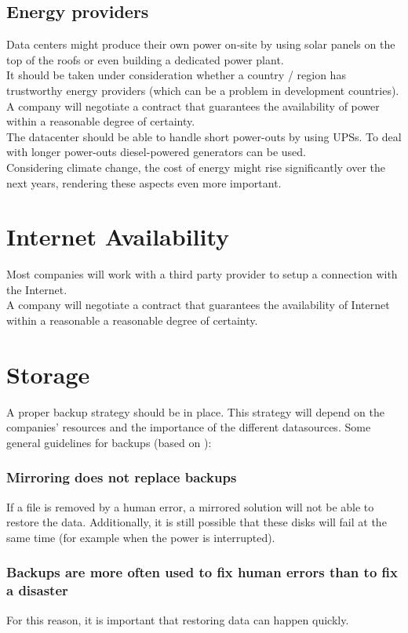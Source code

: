 \documentclass[12pt]{report}
\begin{document}
\subsection{Energy providers}
\label{energy_provider}
Data centers might produce their own power on-site by
using solar panels on the top of the roofs or even building a dedicated
power plant.\\
It should be taken under consideration whether a country / region has
 trustworthy energy providers (which can be a problem in development 
countries).\\
A company will negotiate a contract that guarantees the availability of power
within a reasonable degree of certainty.\\
The datacenter should be able to handle short power-outs by using
UPSs. To deal with longer power-outs diesel-powered generators can be used.\\
Considering climate change, the cost of energy might rise
significantly over the next years, rendering these aspects even more important.

\section{Internet Availability}
Most companies will work with a third party provider to setup a
connection with the Internet. \\
A company will negotiate a contract that guarantees the availability of Internet
within a reasonable a reasonable degree of certainty.\\

\section{Storage}
A proper backup strategy should be in place. This strategy will depend
on the companies' resources and the importance of the different
datasources.
Some general guidelines for backups (based on \cite{ha_book}):
\subsubsection{Mirroring does not replace backups}
If a file
is removed by a human error, a mirrored solution will not be able to
restore the data.
Additionally, it is still possible that these disks will
fail at the same time
(for example when the power is interrupted).

\subsubsection{Backups are more often used to fix human errors
  than to fix a disaster}
For this reason, it is important that restoring data can happen
quickly.
\end{document}

